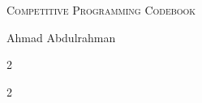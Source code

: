\documentclass[letterpaper]{article} %
\begin{document}
  \thispagestyle{fancy}
  
  \begin{center}
    \Huge\textsc{Competitive Programming Codebook}

    \vspace{0.35cm}

    \LARGE Ahmad Abdulrahman

    \vspace{0.50cm}
  \end{center}

  \begin{multicols*}{2}
    \tableofcontents
  \end{multicols*}
  
  \enlargethispage*{\baselineskip}
  \pagebreak
  
  
  \setcounter{page}{1}
  
  \begin{multicols*}{2}
    
  \end{multicols*}
\end{document}
